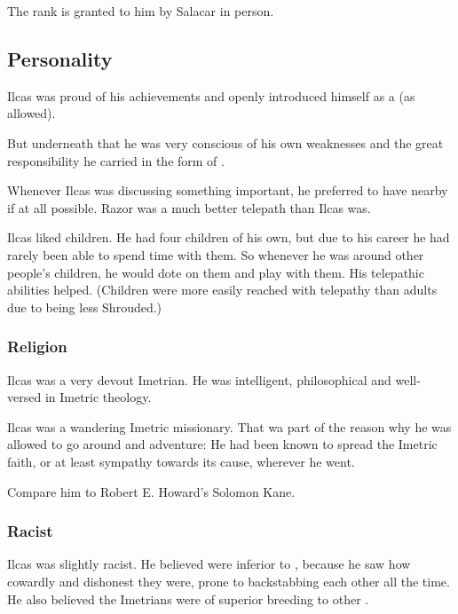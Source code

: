 The rank is granted to him by Salacar in person. 









\subsection{Personality}
Ilcas was proud of his achievements and openly introduced himself as a  (as  allowed). 

But underneath that he was very conscious of his own weaknesses and the great responsibility he carried in the form of . 

Whenever Ilcas was discussing something important, he preferred to have  nearby if at all possible. 
Razor was a much better telepath than Ilcas was. 

Ilcas liked children. 
He had four children of his own, but due to his career he had rarely been able to spend time with them. 
So whenever he was around other people's children, he would dote on them and play with them. 
His telepathic abilities helped. 
(Children were more easily reached with telepathy than adults due to being less Shrouded.)





\subsubsection{Religion}
Ilcas was a very devout Imetrian. 
He was intelligent, philosophical and well-versed in Imetric theology. 

Ilcas was a wandering Imetric missionary.
That wa part of the reason why he was allowed to go around and adventure: 
He had been known to spread the Imetric faith, or at least sympathy towards its cause, wherever he went. 

Compare him to Robert E. Howard's Solomon Kane.





\subsubsection{Racist}
Ilcas was slightly racist. 
He believed \humans{} were inferior to \scathae, because he saw how cowardly and dishonest they were, prone to backstabbing each other all the time. 
He also believed the Imetrians were of superior breeding to other \scathae. 









